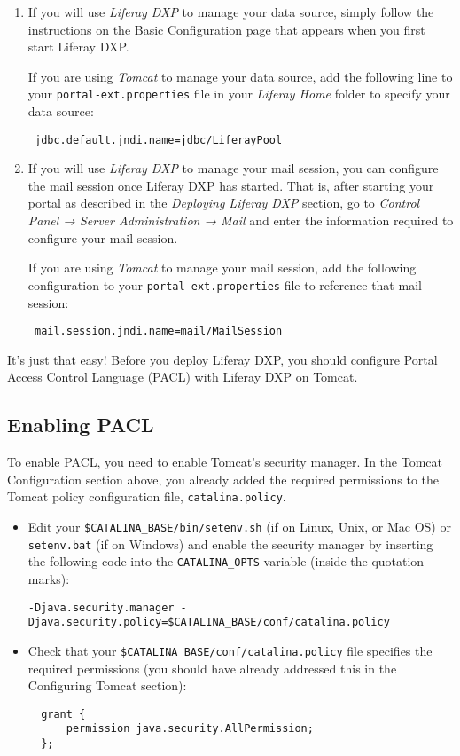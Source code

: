 \begin{enumerate}
\def\labelenumi{\arabic{enumi}.}
\item
  If you will use \emph{Liferay DXP} to manage your data source, simply
  follow the instructions on the Basic Configuration page that appears
  when you first start Liferay DXP.

  If you are using \emph{Tomcat} to manage your data source, add the
  following line to your \texttt{portal-ext.properties} file in your
  \emph{Liferay Home} folder to specify your data source:

\begin{verbatim}
 jdbc.default.jndi.name=jdbc/LiferayPool
\end{verbatim}
\item
  If you will use \emph{Liferay DXP} to manage your mail session, you
  can configure the mail session once Liferay DXP has started. That is,
  after starting your portal as described in the \emph{Deploying Liferay
  DXP} section, go to \emph{Control Panel → Server Administration →
  Mail} and enter the information required to configure your mail
  session.

  If you are using \emph{Tomcat} to manage your mail session, add the
  following configuration to your \texttt{portal-ext.properties} file to
  reference that mail session:

\begin{verbatim}
 mail.session.jndi.name=mail/MailSession
\end{verbatim}
\end{enumerate}

It's just that easy! Before you deploy Liferay DXP, you should configure
Portal Access Control Language (PACL) with Liferay DXP on Tomcat.

\subsection{Enabling PACL}\label{enabling-pacl}

To enable PACL, you need to enable Tomcat's security manager. In the
Tomcat Configuration section above, you already added the required
permissions to the Tomcat policy configuration file,
\texttt{catalina.policy}.

\begin{itemize}
\item
  Edit your \texttt{\$CATALINA\_BASE/bin/setenv.sh} (if on Linux, Unix,
  or Mac OS) or \texttt{setenv.bat} (if on Windows) and enable the
  security manager by inserting the following code into the
  \texttt{CATALINA\_OPTS} variable (inside the quotation marks):

  \texttt{-Djava.security.manager\ -Djava.security.policy=\$CATALINA\_BASE/conf/catalina.policy}
\item
  Check that your \texttt{\$CATALINA\_BASE/conf/catalina.policy} file
  specifies the required permissions (you should have already addressed
  this in the Configuring Tomcat section):

\begin{verbatim}
  grant {
      permission java.security.AllPermission;
  };
\end{verbatim}
\end{itemize}

